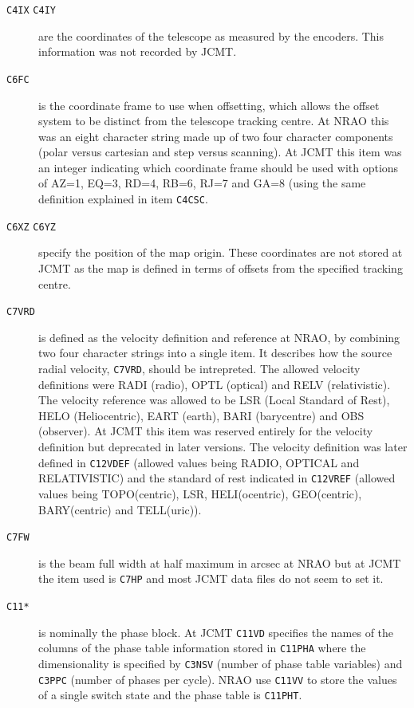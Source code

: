\documentclass[final,authoryear,5p,times,twocolumn]{elsarticle}
\begin{document}
\begin{description}
\item[\texttt{C4IX} \texttt{C4IY}] are the coordinates of the
  telescope as measured by the encoders. This information was not
  recorded by JCMT.

\item[\texttt{C6FC}] is the coordinate frame to use when offsetting,
  which allows the offset system to be distinct from the telescope
  tracking centre. At NRAO this was an eight character string made up
  of two four character components (polar versus cartesian and step
  versus scanning). At JCMT this item was an integer indicating which
  coordinate frame should be used with options of AZ=1, EQ=3, RD=4,
  RB=6, RJ=7 and GA=8 (using the same definition explained in item
  \texttt{C4CSC}.

\item[\texttt{C6XZ} \texttt{C6YZ}] specify the position of the map
  origin. These coordinates are not stored at JCMT as the map is
  defined in terms of offsets from the specified tracking centre.

\item[\texttt{C7VRD}] is defined as the velocity definition and
  reference at NRAO, by combining two four character strings into a
  single item. It describes how the source radial velocity,
  \texttt{C7VRD}, should be intrepreted. The allowed velocity
  definitions were RADI (radio), OPTL (optical) and RELV
  (relativistic). The velocity reference was allowed to be LSR (Local
  Standard of Rest), HELO (Heliocentric), EART (earth), BARI
  (barycentre) and OBS (observer). At JCMT this item was reserved
  entirely for the velocity definition but deprecated in later
  versions. The velocity definition was later defined in
  \texttt{C12VDEF} (allowed values being RADIO, OPTICAL and
  RELATIVISTIC) and the standard of rest indicated in \texttt{C12VREF}
  (allowed values being TOPO(centric), LSR, HELI(ocentric),
  GEO(centric), BARY(centric) and TELL(uric)).

\item[\texttt{C7FW}] is the beam full width at half maximum in arcsec
  at NRAO but at JCMT the item used is \texttt{C7HP} and most JCMT data
  files do not seem to set it.

\item[\texttt{C11*}] is nominally the phase block. At JCMT
  \texttt{C11VD} specifies the names of the columns of the phase table
  information stored in \texttt{C11PHA} where the dimensionality is
  specified by \texttt{C3NSV} (number of phase table variables) and
  \texttt{C3PPC} (number of phases per cycle). NRAO use \texttt{C11VV}
  to store the values of a single switch state and the phase table is
  \texttt{C11PHT}.


\end{description}
\end{document}
